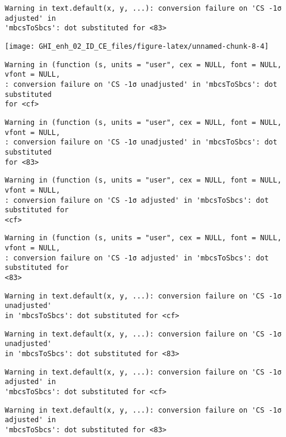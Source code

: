 \documentclass[
  10pt,
  a4paper,oneside]{article}
\begin{document}
\begin{verbatim}
Warning in text.default(x, y, ...): conversion failure on 'CS -1σ adjusted' in
'mbcsToSbcs': dot substituted for <83>
\end{verbatim}

\begin{center}\texttt{[image: GHI\_enh\_02\_ID\_CE\_files/figure-latex/unnamed-chunk-8-4]} \end{center}

\begin{verbatim}
Warning in (function (s, units = "user", cex = NULL, font = NULL, vfont = NULL,
: conversion failure on 'CS -1σ unadjusted' in 'mbcsToSbcs': dot substituted
for <cf>
\end{verbatim}

\begin{verbatim}
Warning in (function (s, units = "user", cex = NULL, font = NULL, vfont = NULL,
: conversion failure on 'CS -1σ unadjusted' in 'mbcsToSbcs': dot substituted
for <83>
\end{verbatim}

\begin{verbatim}
Warning in (function (s, units = "user", cex = NULL, font = NULL, vfont = NULL,
: conversion failure on 'CS -1σ adjusted' in 'mbcsToSbcs': dot substituted for
<cf>
\end{verbatim}

\begin{verbatim}
Warning in (function (s, units = "user", cex = NULL, font = NULL, vfont = NULL,
: conversion failure on 'CS -1σ adjusted' in 'mbcsToSbcs': dot substituted for
<83>
\end{verbatim}

\begin{verbatim}
Warning in text.default(x, y, ...): conversion failure on 'CS -1σ unadjusted'
in 'mbcsToSbcs': dot substituted for <cf>
\end{verbatim}

\begin{verbatim}
Warning in text.default(x, y, ...): conversion failure on 'CS -1σ unadjusted'
in 'mbcsToSbcs': dot substituted for <83>
\end{verbatim}

\begin{verbatim}
Warning in text.default(x, y, ...): conversion failure on 'CS -1σ adjusted' in
'mbcsToSbcs': dot substituted for <cf>
\end{verbatim}

\begin{verbatim}
Warning in text.default(x, y, ...): conversion failure on 'CS -1σ adjusted' in
'mbcsToSbcs': dot substituted for <83>
\end{verbatim}
\end{document}
